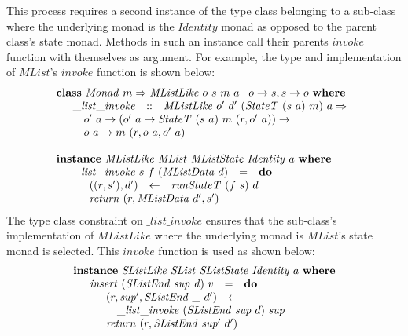 \documentclass[authoryear,preprint]{sigplanconf}
\begin{document}
This process requires a second instance of the type class belonging to a sub-class where the underlying monad is the $\mathit{Identity}$ monad as opposed to the parent class's state monad. Methods in such an instance call their parents $\mathit{invoke}$ function with themselves as argument. For example, the type and implementation of $\mathit{MList}$'s $\mathit{invoke}$ function is shown below:
\begin{displaymath}
\begin{array}{l}
\mathbf{class}~\mathit{Monad}~m \Rightarrow \mathit{MListLike}~o~s~m~a \mid o \to s, s \to o~\mathbf{where} \\
\quad \begin{array}{lcl}
\_\mathit{list}\_\mathit{invoke} & :: & \mathit{MListLike}~o'~d'~(\mathit{StateT}~(s~a)~m)~a \Rightarrow\\
\multicolumn{3}{l}{\quad o'~a \to (o'~a \to \mathit{StateT}~(s~a)~m~(r,o'~a)) \to} \\
\multicolumn{3}{l}{\quad o~a \to m~(r,o~a,o'~a)}
\end{array} \\\\
\mathbf{instance}~\mathit{MListLike}~\mathit{MList}~\mathit{MListState}~\mathit{Identity}~a~\mathbf{where} \\
\quad \begin{array}{lcl}
\_\mathit{list}\_\mathit{invoke}~s~f~(\mathit{MListData}~d) & = & \mathbf{do} \\
\multicolumn{3}{l}{\quad \begin{array}{lcl}
    ((r,s'),d') & \leftarrow & \mathit{runStateT}~(f~s)~d \\
    \multicolumn{3}{l}{\mathit{return}~(r,\mathit{MListData}~d',s')}
    \end{array}}
\end{array}
\end{array}
\end{displaymath}
The type class constraint on $\_\mathit{list}\_\mathit{invoke}$ ensures that the sub-class's implementation of $\mathit{MListLike}$ where the underlying monad is $\mathit{MList}$'s state monad is selected. This $\mathit{invoke}$ function is used as shown below:
\begin{displaymath}
\begin{array}{l}
\mathbf{instance}~\mathit{SListLike}~\mathit{SList}~\mathit{SListState}~\mathit{Identity}~a~\mathbf{where} \\
\quad \begin{array}{lcl}
\mathit{insert}~(\mathit{SListEnd}~\mathit{sup}~\mathit{d})~v & = & \mathbf{do} \\
\multicolumn{3}{l}{\quad \begin{array}{lcl}
    (r,\mathit{sup}',\mathit{SListEnd}~\_~d') & \leftarrow & \\
    \multicolumn{3}{l}{\quad \_\mathit{list}\_\mathit{invoke}~(\mathit{SListEnd}~\mathit{sup}~d)~\mathit{sup}} \\
    \multicolumn{3}{l}{\mathit{return}~(r,\mathit{SListEnd}~\mathit{sup}'~d')}
    \end{array}}
\end{array}
\end{array}
\end{displaymath}
\end{document}
